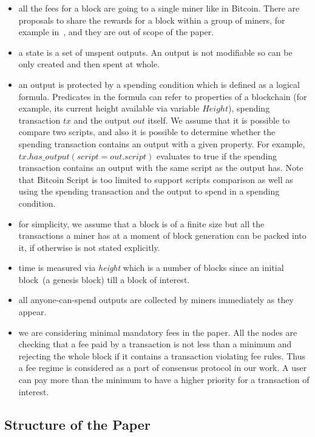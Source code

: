 \documentclass[]{llncs}   %
\begin{document}
\begin{itemize}
  \item{} all the fees for a block are going to a single miner like in Bitcoin. There are proposals to share the rewards for a block within a group of miners, for example in~\cite{eyal2016bitcoin,kogias2016enhancing}, and they are out of scope of the paper.
  \item{} a state is a set of unspent outputs. An output is not modifiable so can be only created and then spent at whole. 
  \item{} an output is protected by a spending condition which is defined as a logical formula. Predicates in the formula can refer to properties of a blockchain (for example, its current height available via variable $Height$), spending transaction $tx$ and the output $out$ itself. We assume that it is possible to compare two scripts, and also it is possible to determine whether the spending transaction contains an output with a given property. For example, $tx.has\_output(script = out.script)$ evaluates to true if the spending transaction contains an output with the same script as the output has. Note that Bitcoin Script is too limited to support scripts comparison as well as using the spending transaction and the output to spend in a spending condition.

  \item{} for simplicity, we assume that a block is of a finite size but all the transactions a miner has at a moment of block generation can be packed into it, if otherwise is not stated explicitly.
  \item{} time is measured via \textit{height} which is a number of blocks since an initial block~(a genesis block) till a block of interest. 
  \item{} all anyone-can-spend outputs are collected by miners immediately as they appear.
  \item{} we are considering minimal mandatory fees in the paper. All the nodes are checking that a fee paid by a transaction is not less than a minimum and rejecting the whole block if it contains a transaction violating fee rules. Thus a fee regime is considered as a part of consensus protocol in our work. A user can pay more than the minimum to have a higher priority for a transaction of interest.   
\end{itemize}

\subsection{Structure of the Paper}
\end{document}

